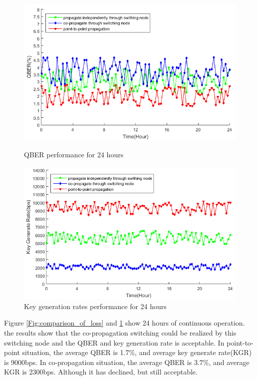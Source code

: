 \documentclass[letterpaper,10pt]{article}
\begin{document}
\begin{figure}[!htb]
   \begin{minipage}{0.48\textwidth}
     \centering
     \includegraphics[width=.9\linewidth]{qber_experiment}
     \caption{QBER performance for 24 hours} \label{Fig:comparison_of_loss}
   \end{minipage}\hfill
   \begin{minipage}{0.48\textwidth}
     \centering
     \includegraphics[width=.9\linewidth]{key_rate_experiment}
     \caption{Key generation rates performance for 24 hours} \label{Fig:comparison_of_rate}
   \end{minipage}
\end{figure}
Figure \ref{Fig:comparison_of_loss} and \ref{Fig:comparison_of_rate} show 24 hours of continuous operation. the results show that the co-propagation switching could be realized by this switching node and the QBER and key generation rate is acceptable. In point-to-point situation, the average QBER is 1.7\%, and average key generate rate(KGR) is 9000bps. In co-propagation situation, the average QBER is 3.7\%, and average KGR is 2300bps. Although it has declined, but still acceptable.
\end{document}
